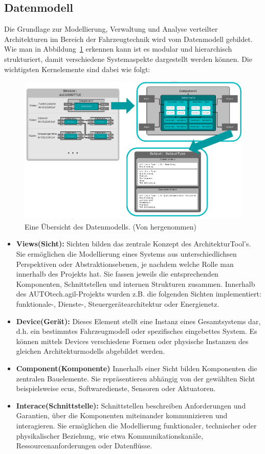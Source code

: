 \subsection*{Datenmodell}

Die Grundlage zur Modellierung, Verwaltung und Analyse verteilter Architekturen im Bereich der Fahrzeugtechnik wird vom Datenmodell gebildet. Wie man in Abbildung~\ref{fig:overview_daten} erkennen kann  ist es modular und hierarchisch strukturiert, damit verschiedene Systemaspekte dargestellt werden können. Die wichtigsten Kernelemente sind dabei wie folgt:

\begin{figure}[h!]
  \centering
  \includegraphics[width=.9\textwidth]{figures/02Grundlagen/Overview_datenmodell.png}
  \caption{Eine Übersicht des Datenmodells. (Von \cite{architekturtooldocu2024} hergenommen)}
  \label{fig:overview_daten}
\end{figure}

\begin{itemize}
  \item \textbf{Views(Sicht):} Sichten bilden das zentrale Konzept des ArchitekturTool's. Sie ermöglichen die Modellierung eines Systems aus unterschiedlichsen Perspektiven oder Abstraktionsebenen, je nachdem welche Rolle man innerhalb des Projekts hat. Sie fassen jeweils die entsprechenden Komponenten, Schnittstellen und internen Strukturen zusammen. Innerhalb des AUTOtech.agil-Projekts wurden z.B. die folgenden Sichten implementiert: funktionale-, Dienste-, Steuergerätearchitektur oder Energienetz.
  \item \textbf{Device(Gerät):} Dieses Element stellt eine Instanz eines Gesamtsystems dar, d.h. ein bestimmtes Fahrzeugmodell oder spezifisches eingebettes System. Es können mittels Devices verschiedene Formen oder physische Instanzen des gleichen Architekturmodells abgebildet werden.
  \item \textbf{Component(Komponente)} Innerhalb einer Sicht bilden Komponenten die zentralen Bauelemente. Sie repräsentieren abhängig von der gewählten Sicht beispielsweise \glspl{ecu}, Softwaredienste, Sensoren oder Aktuatoren.
  \item \textbf{Interace(Schnittstelle):} Schnittstellen beschreiben Anforderungen und Garantien, über die Komponenten miteinander kommunizieren und interagieren. Sie ermöglichen die Modellierung funktionaler, technischer oder physikalischer Beziehung, wie etwa Kommunikationskanäle, Ressourcenanforderungen oder Datenflüsse.
\end{itemize}

